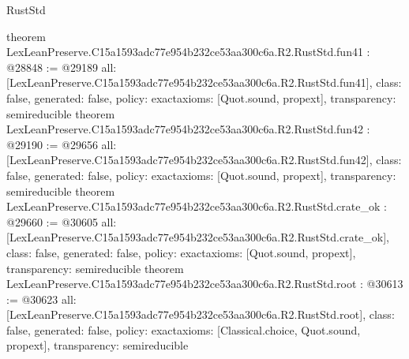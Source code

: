 \begin{lexlean}{RustStd}
\begin{coremodule}
{}
theorem LexLeanPreserve.C15a1593adc77e954b232ce53aa300c6a.R2.RustStd.fun41 : @28848 := @29189 {
  all: [LexLeanPreserve.C15a1593adc77e954b232ce53aa300c6a.R2.RustStd.fun41],
  class: false,
  generated: false,
  policy: exact{axioms: [Quot.sound, propext]},
  transparency: semireducible
}
theorem LexLeanPreserve.C15a1593adc77e954b232ce53aa300c6a.R2.RustStd.fun42 : @29190 := @29656 {
  all: [LexLeanPreserve.C15a1593adc77e954b232ce53aa300c6a.R2.RustStd.fun42],
  class: false,
  generated: false,
  policy: exact{axioms: [Quot.sound, propext]},
  transparency: semireducible
}
theorem LexLeanPreserve.C15a1593adc77e954b232ce53aa300c6a.R2.RustStd.crate_ok : @29660 := @30605 {
  all: [LexLeanPreserve.C15a1593adc77e954b232ce53aa300c6a.R2.RustStd.crate_ok],
  class: false,
  generated: false,
  policy: exact{axioms: [Quot.sound, propext]},
  transparency: semireducible
}
theorem LexLeanPreserve.C15a1593adc77e954b232ce53aa300c6a.R2.RustStd.root : @30613 := @30623 {
  all: [LexLeanPreserve.C15a1593adc77e954b232ce53aa300c6a.R2.RustStd.root],
  class: false,
  generated: false,
  policy: exact{axioms: [Classical.choice, Quot.sound, propext]},
  transparency: semireducible
}


\end{coremodule}
\end{lexlean}
